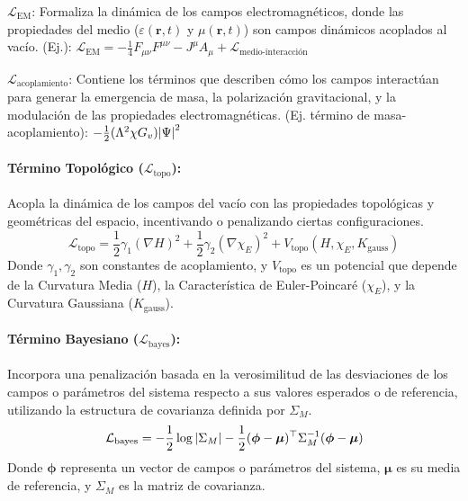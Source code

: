 \documentclass{book}
\begin{document}
$\mathcal{L}_{\text{EM}}$: Formaliza la dinámica de los campos electromagnéticos, donde las propiedades del medio ($\varepsilon(\mathbf{r},t)$ y $\mu(\mathbf{r},t)$) son campos dinámicos acoplados al vacío. (Ej.):
$\mathcal{L}_{\text{EM}}=-\frac{1}{4}F_{\mu\nu}F^{\mu\nu}-J^\mu A_\mu+\mathcal{L}_{\text{medio-interacción}}$

$\mathcal{L}_{\text{acoplamiento}}$: Contiene los términos que describen cómo los campos interactúan para generar la emergencia de masa, la polarización gravitacional, y la modulación de las propiedades electromagnéticas. (Ej. término de masa-acoplamiento): $-\frac{1}{2}(\Lambda^2\chi G_v)\abs{\Psi}^2$

\paragraph{Término Topológico ($\mathcal{L}_{\text{topo}}$):} Acopla la dinámica de los campos del vacío con las propiedades topológicas y geométricas del espacio, incentivando o penalizando ciertas configuraciones.
\begin{equation}
    \mathcal{L}_{\text{topo}}=\frac{1}{2}\gamma_1(\nabla H)^2+\frac{1}{2}\gamma_2(\nabla\chi_E)^2+V_{\text{topo}}(H,\chi_E,K_{\text{gauss}})
\end{equation}
Donde $\gamma_1,\gamma_2$ son constantes de acoplamiento, y $V_{\text{topo}}$ es un potencial que depende de la Curvatura Media ($H$), la Característica de Euler-Poincaré ($\chi_E$), y la Curvatura Gaussiana ($K_{\text{gauss}}$).

\paragraph{Término Bayesiano ($\mathcal{L}_{\text{bayes}}$):} Incorpora una penalización basada en la verosimilitud de las desviaciones de los campos o parámetros del sistema respecto a sus valores esperados o de referencia, utilizando la estructura de covarianza definida por $\Sigma_M$.
\begin{equation}
    \mathcal{L}_{\text{bayes}}=-\frac{1}{2}\log\abs{\Sigma_M}-\frac{1}{2}(\boldsymbol{\phi}-\boldsymbol{\mu})^{\top}\Sigma_M^{-1}(\boldsymbol{\phi}-\boldsymbol{\mu})
\end{equation}
Donde $\boldsymbol{\phi}$ representa un vector de campos o parámetros del sistema, $\boldsymbol{\mu}$ es su media de referencia, y $\Sigma_M$ es la matriz de covarianza.
\end{document}
